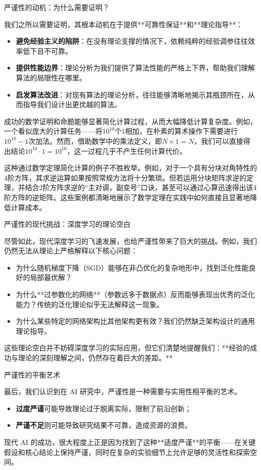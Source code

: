 严谨性的动机：为什么需要证明？

我们之所以需要证明，其根本动机在于提供**可靠性保证**和**理论指导**：

\begin{itemize}
\item \textbf{避免经验主义的陷阱}：在没有理论支撑的情况下，依赖纯粹的经验调参往往效率低下且不可靠。
\item \textbf{提供性能边界}：理论分析为我们提供了算法性能的严格上下界，帮助我们理解算法的局限性在哪里。
\item \textbf{启发算法改进}：对现有算法的理论分析，往往能够清晰地揭示其瓶颈所在，从而指导我们设计出更优越的算法。
\end{itemize}

成功的数学证明和命题能够显著简化计算过程，从而大幅降低计算复杂度。例如，一个看似庞大的计算任务——将$10^{10}$个$1$相加，在朴素的算术操作下需要进行$10^{10}-1$次加法。然而，借助数学中的乘法定义，即$N \times 1 = N$，我们可以直接得出结论$10^{10} \cdot 1 = 10^{10}$，这一过程几乎不产生任何计算代价。

这种通过数学定理简化计算的例子不胜枚举。例如，对于一个具有分块对角特性的4阶方阵，其求逆运算如果按照常规方法将十分繁琐。但若运用分块矩阵求逆的定理，并结合2阶方阵求逆的“主对调，副变号”口诀，甚至可以通过心算迅速得出该4阶方阵的逆矩阵。这些案例都清晰地展示了数学定理在实践中如何直接且显著地降低计算成本。

严谨性的现代挑战：深度学习的理论空白

尽管如此，现代深度学习的飞速发展，也给严谨性带来了巨大的挑战。例如，我们仍然无法从理论上严格解释以下核心问题：

\begin{itemize}
\item 为什么随机梯度下降（SGD）能够在非凸优化的复杂地形中，找到泛化性能良好的局部最优解？
\item 为什么**过参数化的网络**（参数远多于数据点）反而能够表现出优秀的泛化能力？传统的泛化理论似乎无法解释这一现象。
\item 为什么某些特定的网络架构比其他架构更有效？我们仍然缺乏架构设计的通用理论指导。
\end{itemize}

这些理论空白并不妨碍深度学习的实际应用，但它们清楚地提醒我们：**经验的成功与理论的深刻理解之间，仍然存在着巨大的差距。**

严谨性的平衡艺术

最后，我们认识到在 AI 研究中，严谨性是一种需要与实用性相平衡的艺术。
\begin{itemize}
\item \textbf{过度严谨}可能导致理论过于脱离实际，限制了前沿创新；
\item \textbf{严谨不足}则可能导致研究结果不可靠，造成资源的浪费。
\end{itemize}
现代 AI 的成功，很大程度上正是因为找到了这种**适度严谨**的平衡——在关键假设和核心结论上保持严谨，同时在复杂的实验细节上允许足够的灵活性和探索空间。

